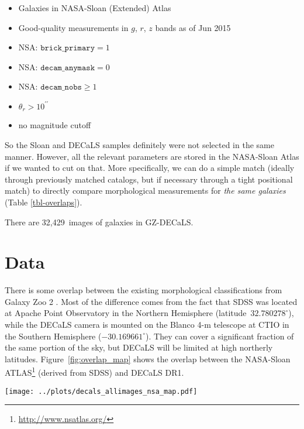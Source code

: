 \documentclass[iop,apj,tighten]{emulateapj}
\begin{document}
\begin{itemize}
    \item Galaxies in NASA-Sloan (Extended) Atlas
    \item Good-quality measurements in $g$, $r$, $z$ bands as of Jun 2015
    \item NSA: $\texttt{brick\_primary} = 1$
    \item NSA: $\texttt{decam\_anymask} = 0$
    \item NSA: $\texttt{decam\_nobs} \geq 1$
    \item $\theta_r > 10^{\prime\prime}$
    \item no magnitude cutoff
\end{itemize}

So the Sloan and DECaLS samples definitely were not selected in the same manner. However, all the relevant parameters are stored in the NASA-Sloan Atlas if we wanted to cut on that. More specifically, we can do a simple match (ideally through previously matched catalogs, but if necessary through a tight positional match) to directly compare morphological measurements for \emph{the same galaxies} (Table \ref{tbl-overlaps}).

There are 32,429~images of galaxies in GZ-DECaLS.

\section{Data}

There is some overlap between the existing morphological classifications from Galaxy Zoo 2 \citep{wil13}. Most of the difference comes from the fact that SDSS was located at Apache Point Observatory in the Northern Hemisphere (latitude~$32.780278^\circ$), while the DECaLS camera is mounted on the Blanco 4-m telescope at CTIO in the Southern Hemisphere ($-30.169661^\circ$). They can cover a significant fraction of the same portion of the sky, but DECaLS will be limited at high northerly latitudes. Figure~\ref{fig:overlap_map} shows the overlap between the NASA-Sloan ATLAS\footnote{\url{http://www.nsatlas.org/}} (derived from SDSS) and DECaLS DR1. 

\begin{figure*}
\centering
\texttt{[image: ../plots/decals\_allimages\_nsa\_map.pdf]}
\caption{Overlap between galaxies in the NASA-Sloan Atlas (red) and selected targets for Galaxy Zoo from DECaLS DR1 (blue).\label{fig:overlap_map}}
\end{figure*}
\end{document}
